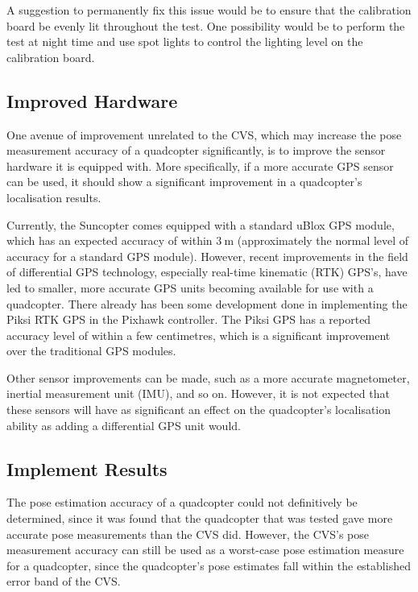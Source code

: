 A suggestion to permanently fix this issue would be to ensure that the calibration board be evenly lit throughout the test. One possibility would be to perform the test at night time and use spot lights to control the lighting level on the calibration board. 

\subsection{Improved Hardware}

One avenue of improvement unrelated to the CVS, which may increase the pose measurement accuracy of a quadcopter significantly, is to improve the sensor hardware it is equipped with. More specifically, if a more accurate GPS sensor can be used, it should show a significant improvement in a quadcopter's localisation results. 

Currently, the Suncopter comes equipped with a standard uBlox GPS module, which has an expected accuracy of within $\SI{3}{\m}$ (approximately the normal level of accuracy for a standard GPS module). However, recent improvements in the field of differential GPS technology, especially real-time kinematic (RTK) GPS's, have led to smaller, more accurate GPS units becoming available for use with a quadcopter. There already has been some development done in implementing the Piksi RTK GPS in the Pixhawk controller. The Piksi GPS has a reported accuracy level of within a few centimetres, which is a significant improvement over the traditional GPS modules. 

Other sensor improvements can be made, such as a more accurate magnetometer, inertial measurement unit (IMU), and so on. However, it is not expected that these sensors will have as significant an effect on the quadcopter's localisation ability as adding a differential GPS unit would. 

\subsection{Implement Results}

The pose estimation accuracy of a quadcopter could not definitively be determined, since it was found that the quadcopter that was tested gave more accurate pose measurements than the CVS did. However, the CVS's pose measurement accuracy can still be used as a worst-case pose estimation measure for a quadcopter, since the quadcopter's pose estimates fall within the established error band of the CVS.\@ 

